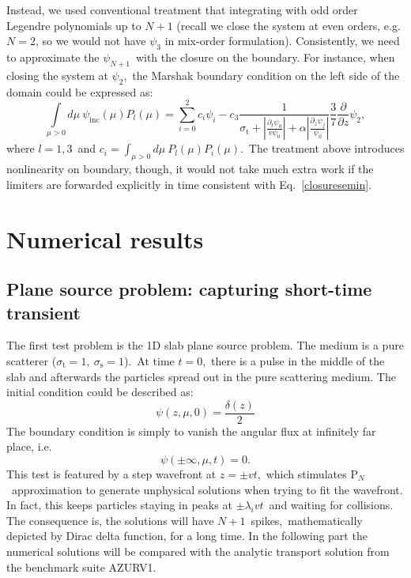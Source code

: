 \documentclass[review]{elsarticle}
\newcommand{\st}{\sigma_\mathrm{t}}
\newcommand{\pn}{P$_N$}
\newcommand{\ppz}{\frac{\partial}{\partial z}}
\newcommand{\psii}[1]{\psi_\ensuremath{{#1}}}
\begin{document}
Instead, we used conventional treatment that integrating with odd order Legendre polynomials up to $N+1$ (recall we close the system at even orders, e.g. $N=2$, so we would not have $\psii{3}$ in mix-order formulation). Consistently, we need to approximate the $\psii{N+1}$~with the closure on the boundary. For instance, when closing the system at $\psii{2}$,~the Marshak boundary condition on the left side of the domain could be expressed as:
\begin{equation}
\int\limits_{\mu>0}d\mu~\psi_{\mathrm{inc}}(\mu)P_l(\mu)=\sum\limits_{i=0}^{2}c_i\psii{i}-c_3\frac{1}{\sigma_\mathrm{t}+\displaystyle|\frac{\partial_t\psii{0}}{v\psii{0}}|+\alpha|\frac{\partial_z\psii{j}}{\psii{0}}|}\frac{3}{7}\ppz\psii{2},
\end{equation}
where $l=1,3$~and $\displaystyle c_i=\int_{\mu>0}d\mu~P_l(\mu)P_i(\mu)$.~The treatment above introduces nonlinearity on boundary, though, it would not take much extra work if the limiters are forwarded explicitly in time consistent with Eq.~\eqref{closuresemin}.

\section{Numerical results}\label{num}
\subsection{Plane source problem: capturing short-time transient}
The first test problem is the 1D slab plane source problem. The medium is a pure scatterer ($\st=1,~\sigma_\mathrm{s}=1$).~At time $t=0$,~there is a pulse in the middle of the slab and afterwards the particles spread out in the pure scattering medium. The initial condition could be described as:
\begin{equation}
\psi(z,\mu,0)=\frac{\delta(z)}{2}
\end{equation}
The boundary condition is simply to vanish the angular flux at infinitely far place, i.e.
\begin{equation}
\psi(\pm\infty,\mu,t)=0.
\end{equation}
This test is featured by a step wavefront at $z=\pm vt$,~which stimulates \pn~approximation to generate unphysical solutions when trying to fit the wavefront. In fact, this keeps particles staying in peaks at $\pm\lambda_ivt$~and waiting for collisions. The consequence is, the solutions will have $N+1$~spikes,~mathematically depicted by Dirac delta function, for a long time. In the following part the numerical solutions will be compared with the analytic transport solution from the benchmark suite AZURV1\cite{ganapol}.
\end{document}
